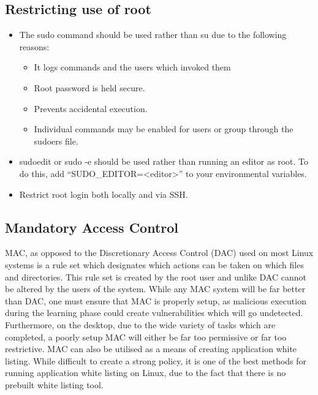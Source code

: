\documentclass[a4paper,11pt]{report}
\begin{document}
			\subsection{Restricting use of root}
				\begin{itemize}
					\item The sudo command should be used rather than su due to the following reasons:
						\begin{itemize}
							\item It logs commands and the users which invoked them
							\item Root password is held secure. 
							\item Prevents accidental execution. 
							\item Individual commands may be enabled for users or group through the sudoers file. 
						\end{itemize}
					\item sudoedit or sudo -e should be used rather than running an editor as root. 
						To do this, add ``SUDO\_EDITOR=<editor>'' to your environmental variables.
					\item Restrict root login both locally and via SSH. 
				\end{itemize}
			\subsection{Mandatory Access Control}
				MAC, as opposed to the Discretionary Access Control (DAC) used on most Linux systems is a rule set which designates which actions can be taken on which files and directories. 
				This rule set is created by the root user and unlike DAC cannot be altered by the users of the system. 
				While any MAC system will be far better than DAC, one must ensure that MAC is properly setup, as malicious execution during the learning phase could create vulnerabilities which will go undetected. 
				Furthermore, on the desktop, due to the wide variety of tasks which are completed, a poorly setup MAC will either be far too permissive or far too restrictive. 
				MAC can also be utilised as a means of creating application white listing.
				While difficult to create a strong policy, it is one of the best methods for running application white listing on Linux, 
				due to the fact that there is no prebuilt white listing tool. 
\end{document}
